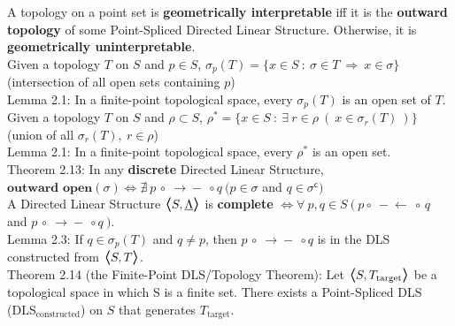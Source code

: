 \documentclass{article}
\newcommand{\hcm}[1][1]{\hspace{#1 cm}}
\newcommand{\bra}[1][1.2]{\scalebox{#1}{$\boldsymbol{\langle}$}}
\newcommand{\nl}[1][12]{\\[#1pt]}
\newcommand{\ket}[1][1.2]{\scalebox{#1}{$\boldsymbol{\rangle}$}}
\newcommand{\imp}{\ \Rightarrow\ }
\newcommand{\st}{\ : \ }
\newcommand{\ch}[1]{\text{#1}}
\newcommand {\chb}[1]{\textbf{#1}}
\newcommand{\lseg}{-\!\!\!\leftarrow\!\!}
\newcommand{\rseg}{\!\rightarrow\!\!\!-}
\newcommand{\ladj}{\circ\!\!\!\!\:\lseg\!\!\:\circ\,}
\newcommand{\radj}{\,\circ\!\!\!\:\rseg\!\!\!\!\:\circ}
\newcommand{\ul}[1]{\underline{#1}}
\begin{document}
\begin{flushleft}
A topology on a point set is \chb{geometrically interpretable} iff it is the \chb{outward topology} of some Point-Spliced Directed Linear Structure. Otherwise, it is \chb{geometrically uninterpretable}.\nl[10]

Given a topology $T$ on $S$ and $p\in S$, {\color{purple} $\sigma_p(T) = \{x\in S \st \sigma \in T \imp x \in \sigma\}$} (intersection of all open sets containing $p$)\nl[10]

\hcm Lemma 2.1: In a finite-point topological space, every $\sigma_p(T)$ is an open set of $T$.\nl[10]

Given a topology $T$ on $S$ and $\rho \subset S$, {\color{purple} $\rho^* = \{x \in S \st \exists\ r \in \rho \ (\ x \in \sigma_r(T)\ )\}$} (union of all $\sigma_r(T),\ r\in \rho$)\nl[5]

\hcm Lemma 2.1: In a finite-point topological space, every $\rho^*$ is an open set.\nl[10]

Theorem 2.13: In any \chb{discrete} Directed Linear Structure,\\\hcm $\chb{outward open}(\sigma) \iff \nexists\ p\radj q\ \Big(p \in \sigma $ and $q \in \sigma^\mathsf{c}\Big)$\nl[10]

A Directed Linear Structure $\bra S, \ul{\Lambda}\ket$ is \chb{complete} $\iff \forall\ p,q\in S\ \big(\ p\ladj q$ and $p \radj q\ \big)$.\nl[10]

\hcm Lemma 2.3: If $q \in \sigma_p(T)$ and $q \neq p$, then $p\radj q$ is in the DLS constructed from $\bra S, T\ket$.\nl[10]

\hcm Theorem 2.14 (the Finite-Point DLS/Topology Theorem): Let $\bra S, T_\ch{target}\ket$ be a topological space in which S is a finite set. There exists a Point-Spliced DLS (DLS$_\ch{constructed}$) on $S$ that generates $T_\ch{target}$.

\end{flushleft}
\end{document}
